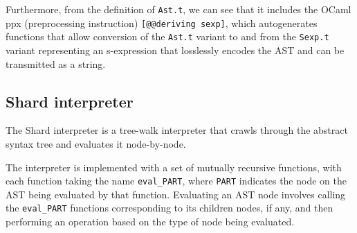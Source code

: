 \documentclass[twoside]{report}
\begin{document}
Furthermore, from the definition of \texttt{Ast.t}, we can see that it includes the OCaml ppx (preprocessing instruction) \texttt{[@@deriving sexp]}, which autogenerates functions that allow conversion of the \texttt{Ast.t} variant to and from the \texttt{Sexp.t} variant representing an s-expression that losslessly encodes the AST and can be transmitted as a string.

\subsection{Shard interpreter}

The Shard interpreter is a tree-walk interpreter that crawls through the abstract syntax tree and evaluates it node-by-node.

The interpreter is implemented with a set of mutually recursive functions, with each function taking the name \texttt{eval\_PART}, where \texttt{PART} indicates the node on the AST being evaluated by that function.
Evaluating an AST node involves calling the \texttt{eval\_PART} functions corresponding to its children nodes, if any, and then performing an operation based on the type of node being evaluated.






\end{document}
